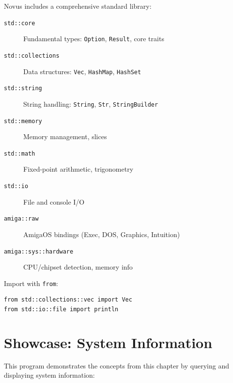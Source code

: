 Novus includes a comprehensive standard library:

\begin{description}
    \item[\texttt{std::core}] Fundamental types: \texttt{Option}, \texttt{Result}, core traits
    \item[\texttt{std::collections}] Data structures: \texttt{Vec}, \texttt{HashMap}, \texttt{HashSet}
    \item[\texttt{std::string}] String handling: \texttt{String}, \texttt{Str}, \texttt{StringBuilder}
    \item[\texttt{std::memory}] Memory management, slices
    \item[\texttt{std::math}] Fixed-point arithmetic, trigonometry
    \item[\texttt{std::io}] File and console I/O
    \item[\texttt{amiga::raw}] AmigaOS bindings (Exec, DOS, Graphics, Intuition)
    \item[\texttt{amiga::sys::hardware}] CPU/chipset detection, memory info
\end{description}

Import with \texttt{from}:

\begin{lstlisting}
from std::collections::vec import Vec
from std::io::file import println
\end{lstlisting}

\section{Showcase: System Information}
\label{sec:showcase-sysinfo}

This program demonstrates the concepts from this chapter by querying and displaying system information:

